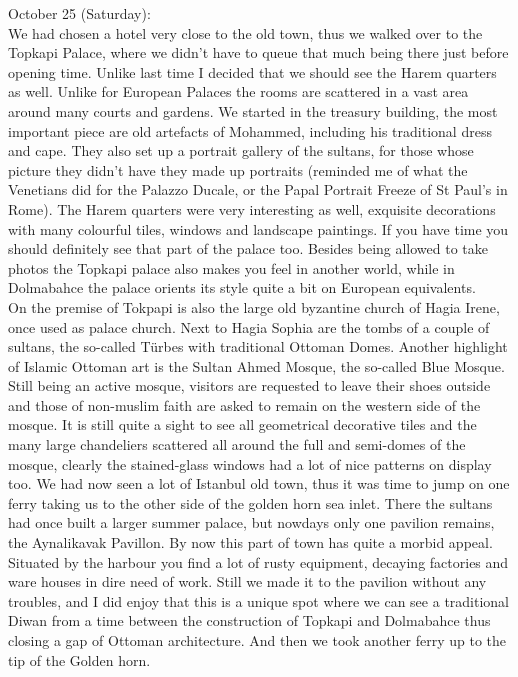 October 25 (Saturday):\\
We had chosen a hotel very close to the old town, thus we walked over to the Topkapi Palace, where we didn't have to queue that much being there just before opening time. Unlike last time I decided that we should see the Harem quarters as well. Unlike for European Palaces the rooms are scattered in a vast area around many courts and gardens. We started in the treasury building, the most important piece are old artefacts of Mohammed, including his traditional dress and cape. They also set up a portrait gallery of the sultans, for those whose picture they didn't have they made up portraits (reminded me of what the Venetians did for the Palazzo Ducale, or the Papal Portrait Freeze of St Paul's in Rome). The Harem quarters were very interesting as well, exquisite decorations with many colourful tiles, windows and landscape paintings. If you have time you should definitely see that part of the palace too. Besides being allowed to take photos the Topkapi palace also makes you feel in another world, while in Dolmabahce the palace orients its style quite a bit on European equivalents.\\
On the premise of Tokpapi is also the large old byzantine church of Hagia Irene, once used as palace church. Next to Hagia Sophia are the tombs of a couple of sultans, the so-called T\"urbes with traditional Ottoman Domes. Another highlight of Islamic Ottoman art is the Sultan Ahmed Mosque, the so-called Blue Mosque. Still being an active mosque, visitors are requested to leave their shoes outside and those of non-muslim faith are asked to remain on the western side of the mosque. It is still quite a sight to see all geometrical decorative tiles and the many large chandeliers scattered all around the full and semi-domes of the mosque, clearly the stained-glass windows had a lot of nice patterns on display too. We had now seen a lot of Istanbul old town, thus it was time to jump on one ferry taking us to the other side of the golden horn sea inlet. There the sultans had once built a larger summer palace, but nowdays only one pavilion remains, the Aynalikavak Pavillon. By now this part of town has quite a morbid appeal. Situated by the harbour you find a lot of rusty equipment, decaying factories and ware houses in dire need of work. Still we made it to the pavilion without any troubles, and I did enjoy that this is a unique spot where we can see a traditional Diwan from a time between the construction of Topkapi and Dolmabahce thus closing a gap of Ottoman architecture. And then we took another ferry up to the tip of the Golden horn.\\
